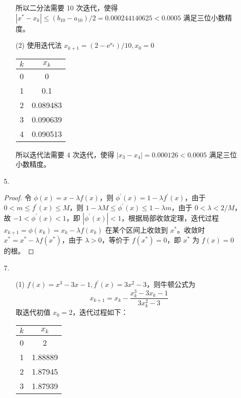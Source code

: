 \documentclass{sjtuarticle}
\begin{document}
\begin{itemize}
\begin{solution}
\begin{enumerate}
    所以二分法需要 10 次迭代，使得$|x^*-x_k|\leq(b_{10}-a_{10})/2=0.000244140625<0.0005$ 满足三位小数精度。
    \item[(2)] 使用迭代法 $x_{k+1}=(2-\mathrm{e}^{x_k})/10, x_0=0$
    
    \begin{table}[H]
        \centering
        \begin{tabular}{cc}
            \hline
            $k$ & $x_k$ \\
            \hline
            0 & 0 \\
            1 & 0.1 \\
            2 & 0.089483 \\
            3 & 0.090639 \\
            4 & 0.090513 \\
            \hline
        \end{tabular}
    \end{table}

    所以迭代法需要 4 次迭代，使得 $|x_3-x_4|=0.000126<0.0005$ 满足三位小数精度。

    \end{enumerate}
    \end{solution}
    \item[5.] \begin{proof}
        令 $\phi(x)=x-\lambda f(x)$，则 $\phi^\prime(x)=1-\lambda f^\prime(x)$，由于 $0<m\leq f^\prime (x)\leq M$，则 $1-\lambda M\leq\phi^\prime(x)\leq1-\lambda m$，由于 $0<\lambda<2/M$，故 $-1<\phi^\prime (x)<1$，即 $|\phi^\prime(x)|<1$，根据局部收敛定理，迭代过程 $x_{k+1}=\phi(x_k)=x_k-\lambda f(x_k)$ 在某个区间上收敛到 $x^*$。收敛时 $x^*=x^*-\lambda f(x^*)$，由于 $\lambda>0$，等价于 $f(x^*)=0$，即 $x^*$ 为 $f(x)=0$ 的根。
    \end{proof}
    \item[7.] \begin{solution}
        \begin{itemize}
            \item[(1)] $f(x)=x^3-3x-1, f^\prime(x)=3x^2-3$，则牛顿公式为
            \begin{equation*}
                x_{k+1}=x_k-\frac{x_k^3-3x_k-1}{3x_k^2-3}
            \end{equation*}
            取迭代初值 $x_0=2$，迭代过程如下：
            
            \begin{table}[H]
                \centering
                \begin{tabular}{cc}
                    \hline
                    $k$ & $x_k$ \\
                    \hline
                    0 & 2 \\
                    1 & 1.88889 \\
                    2 & 1.87945 \\
                    3 & 1.87939 \\
                    \hline
                \end{tabular}
            \end{table}


\end{itemize}
\end{solution}
\end{itemize}
\end{document}
